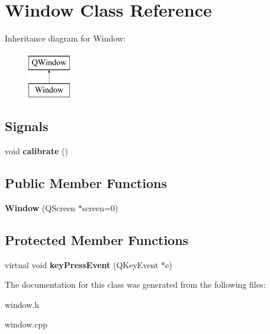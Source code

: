 \hypertarget{classWindow}{}\section{Window Class Reference}
\label{classWindow}
Inheritance diagram for Window\+:\begin{figure}[H]
\begin{center}
\leavevmode
\includegraphics[height=2.000000cm]{classWindow}
\end{center}
\end{figure}
\subsection*{Signals}
\begin{DoxyCompactItemize}
\item 
void {\bfseries calibrate} ()\hypertarget{classWindow_a83e2ec02725fb17ac682b7de4a09f8d8}{}\label{classWindow_a83e2ec02725fb17ac682b7de4a09f8d8}

\end{DoxyCompactItemize}
\subsection*{Public Member Functions}
\begin{DoxyCompactItemize}
\item 
{\bfseries Window} (Q\+Screen $\ast$screen=0)\hypertarget{classWindow_aca6dcd6e39eeb5284f8dea2cf22e3977}{}\label{classWindow_aca6dcd6e39eeb5284f8dea2cf22e3977}

\end{DoxyCompactItemize}
\subsection*{Protected Member Functions}
\begin{DoxyCompactItemize}
\item 
virtual void {\bfseries key\+Press\+Event} (Q\+Key\+Event $\ast$e)\hypertarget{classWindow_a5d729d5dc8bf34c67de323555f173b8f}{}\label{classWindow_a5d729d5dc8bf34c67de323555f173b8f}

\end{DoxyCompactItemize}


The documentation for this class was generated from the following files\+:\begin{DoxyCompactItemize}
\item 
window.\+h\item 
window.\+cpp\end{DoxyCompactItemize}
